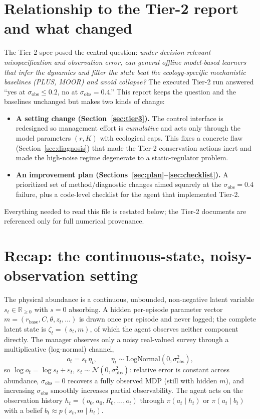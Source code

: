 \documentclass[11pt]{article}
\newcommand{\rbase}{r_{\mathrm{base}}}
\newcommand{\sobs}{\sigma_{\mathrm{obs}}}
\begin{document}
\section{Relationship to the Tier-2 report and what changed}
The Tier-2 spec posed the central question: \emph{under decision-relevant
misspecification and observation error, can general offline model-based learners
that infer the dynamics and filter the state beat the ecology-specific mechanistic
baselines (PLUS, MOOR) and avoid collapse?} The executed Tier-2 run answered
``yes at $\sobs\!\le\!0.2$, no at $\sobs{=}0.4$.'' This report keeps the question
and the baselines unchanged but makes two kinds of change:
\begin{itemize}[nosep,leftmargin=1.4em]
\item \textbf{A setting change (Section~\ref{sec:tier3}).} The control interface is
redesigned so management effort is \emph{cumulative} and acts only through the
model parameters $(r,K)$ with ecological caps. This fixes a concrete flaw
(Section~\ref{sec:diagnosis}) that made the Tier-2 conservation actions inert and
made the high-noise regime degenerate to a static-regulator problem.
\item \textbf{An improvement plan (Sections~\ref{sec:plan}--\ref{sec:checklist}).}
A prioritized set of method/diagnostic changes aimed squarely at the
$\sobs{=}0.4$ failure, plus a code-level checklist for the agent that implemented
Tier-2.
\end{itemize}
Everything needed to read this file is restated below; the Tier-2 documents are
referenced only for full numerical provenance.

\section{Recap: the continuous-state, noisy-observation setting}
\label{sec:recap}
The physical abundance is a continuous, unbounded, non-negative latent variable
$s_t\in\mathbb{R}_{\ge 0}$ with $s{=}0$ absorbing. A hidden per-episode parameter
vector $m=(\rbase,C,\theta,z_t,\dots)$ is drawn once per episode and never logged;
the complete latent state is $\zeta_t=(s_t,m)$, of which the agent observes neither
component directly. The manager observes only a noisy real-valued survey through a
multiplicative (log-normal) channel,
\begin{equation}
o_t = s_t\,\eta_t,\qquad \eta_t\sim\mathrm{LogNormal}(0,\sobs^2),
\label{eq:obs}
\end{equation}
so $\log o_t=\log s_t+\varepsilon_t$, $\varepsilon_t\sim\mathcal{N}(0,\sobs^2)$:
relative error is constant across abundance, $\sobs{=}0$ recovers a fully observed
MDP (still with hidden $m$), and increasing $\sobs$ smoothly increases partial
observability. The agent acts on the observation history
$h_t=(o_0,a_0,R_0,\dots,o_t)$ through $\pi(a_t\mid h_t)$ or $\pi(a_t\mid b_t)$ with
a belief $b_t\approx p(s_t,m\mid h_t)$.
\end{document}
